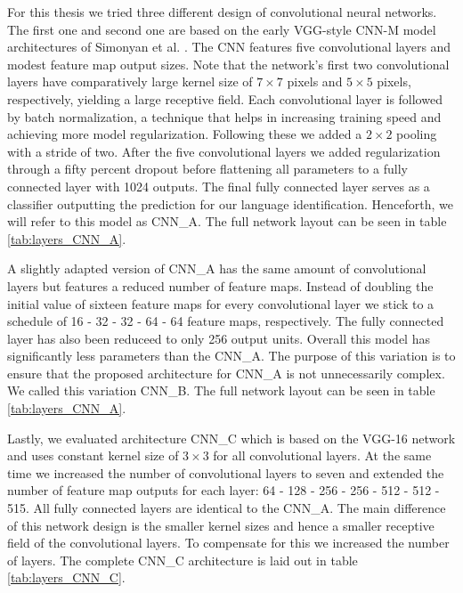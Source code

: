 For this thesis we tried three different design of convolutional neural networks. The first one and second one are based on the early VGG-style CNN-M model architectures of Simonyan et al. \cite{Chatfield14}. The CNN features five convolutional layers and modest feature map output sizes. Note that the network's first two convolutional layers have comparatively large kernel size of $7\times7$ pixels and $5\times5$ pixels, respectively, yielding a large receptive field. Each convolutional layer is followed by batch normalization\cite{ioffe2015batch}, a technique that helps in increasing training speed and achieving more model regularization. Following these we added a $2\times2$ pooling with a stride of two. After the five convolutional layers we added regularization through a fifty percent dropout before flattening all parameters to a fully connected layer with 1024 outputs. The final fully connected layer serves as a classifier outputting the prediction for our language identification. Henceforth, we will refer to this model as CNN\_A. The full network layout can be seen in table \ref{tab:layers_CNN_A}.

A slightly adapted version of CNN\_A has the same amount of convolutional layers but features  a reduced number of feature maps. Instead of doubling the initial value of sixteen feature maps for every convolutional layer we stick to a schedule of 16 - 32 - 32 - 64 - 64 feature maps, respectively. The fully connected layer has also been reduceed to only 256 output units. Overall this model has significantly less parameters than the CNN\_A. The purpose of this variation is to ensure that the proposed architecture for CNN\_A is not unnecessarily complex. We called this variation CNN\_B. The full network layout can be seen in table \ref{tab:layers_CNN_A}.

	
Lastly, we evaluated architecture CNN\_C which is based on the VGG-16 network\cite{simonyan2014very} and uses constant kernel size of $3\times3$ for all convolutional layers. At the same time we increased the number of convolutional layers to seven and extended the number of feature map outputs for each layer: 64 - 128 - 256 - 256 - 512 - 512 - 515. All fully connected layers are identical to the CNN\_A. The main difference of this network design is the smaller kernel sizes and hence a smaller receptive field of the convolutional layers. To compensate for this we increased the number of layers. The complete CNN\_C architecture is laid out in table \ref{tab:layers_CNN_C}.


